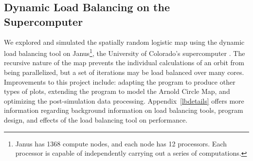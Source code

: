 \subsection{Dynamic Load Balancing on the Supercomputer}
We explored and simulated the spatially random logistic map using the
dynamic load balancing tool on Janus\footnote{Janus has 1368 compute nodes, and
  each node has 12 processors. Each processor is capable of
  independently carrying
  out a series of computations.}, the University of Colorado's supercomputer
\cite{janus}. The recursive nature of the map prevents the individual
calculations of an orbit from being parallelized, but a set of
iterations may be load balanced over many
cores. Improvements to this project include: adapting the program to
produce other types of plots, extending the program to model
the Arnold Circle Map, and optimizing the post-simulation data
processing. Appendix~\ref{lbdetails} offers more information regarding
background information on load balancing tools, program design, and effects of the load balancing tool on performance.